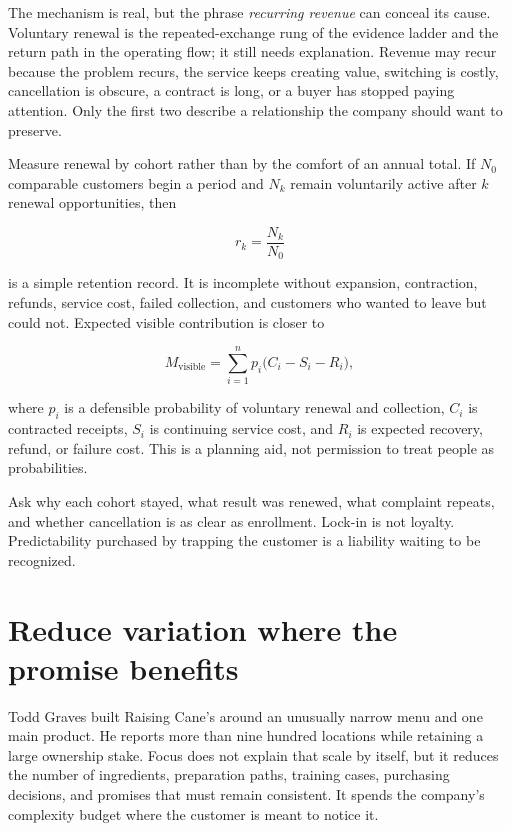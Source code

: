 The mechanism is real, but the phrase \emph{recurring revenue} can conceal its
cause. Voluntary renewal is the repeated-exchange rung of the evidence ladder
and the return path in the operating flow; it still needs explanation. Revenue
may recur because the problem recurs, the service keeps creating value,
switching is costly, cancellation is obscure, a contract is long, or a buyer
has stopped paying attention. Only the first two describe a relationship the
company should want to preserve.

Measure renewal by cohort rather than by the comfort of an annual total. If
\(N_0\) comparable customers begin a period and \(N_k\) remain voluntarily
active after \(k\) renewal opportunities, then

\begin{equation}
r_k=\frac{N_k}{N_0}
\end{equation}

is a simple retention record. It is incomplete without expansion, contraction,
refunds, service cost, failed collection, and customers who wanted to leave but
could not. Expected visible contribution is closer to

\begin{equation}
M_{\mathrm{visible}}
=\sum_{i=1}^{n}p_i\bigl(C_i-S_i-R_i\bigr),
\end{equation}

where \(p_i\) is a defensible probability of voluntary renewal and collection,
\(C_i\) is contracted receipts, \(S_i\) is continuing service cost, and
\(R_i\) is expected recovery, refund, or failure cost. This is a planning aid,
not permission to treat people as probabilities.

Ask why each cohort stayed, what result was renewed, what complaint repeats,
and whether cancellation is as clear as enrollment. Lock-in is not loyalty.
Predictability purchased by trapping the customer is a liability waiting to
be recognized.

\section{Reduce variation where the promise benefits}

Todd Graves built Raising Cane's around an unusually narrow menu and one main
product. He reports more than nine hundred locations while retaining a large
ownership stake. Focus does not explain that scale by itself, but it reduces
the number of ingredients, preparation paths, training cases, purchasing
decisions, and promises that must remain consistent. It spends the company's
complexity budget where the customer is meant to notice it.


